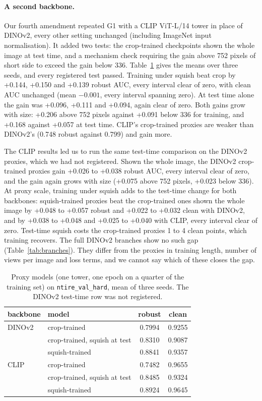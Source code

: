 \documentclass[letterpaper]{article} %
\begin{document}
\paragraph{A second backbone.} Our fourth amendment repeated G1 with a CLIP
ViT-L/14 tower \cite{radford2021clip} in place of DINOv2, every other setting
unchanged (including ImageNet input normalisation). It added two tests: the
crop-trained checkpoints shown the whole image at test time, and a mechanism
check requiring the gain above 752 pixels of short side to exceed the gain
below 336. Table~\ref{tab:clip} gives the means over three seeds, and every
registered test passed. Training under squish beat crop by +0.144, +0.150 and
+0.139 robust AUC, every interval clear of zero, with clean AUC unchanged
(mean $-0.001$, every interval spanning zero). At test time alone the gain
was +0.096, +0.111 and +0.094, again clear of zero. Both gains grow with
size: +0.206 above 752 pixels against +0.091 below 336 for training, and
+0.168 against +0.057 at test time. CLIP's crop-trained proxies are weaker
than DINOv2's (0.748 robust against 0.799) and gain more.

The CLIP results led us to run the same test-time comparison on the DINOv2
proxies, which we had not registered. Shown the whole image, the DINOv2
crop-trained proxies gain +0.026 to +0.038 robust AUC, every interval clear
of zero, and the gain again grows with size (+0.075 above 752 pixels, +0.023
below 336). At proxy scale, training under squish adds to the test-time
change for both backbones: squish-trained proxies beat the crop-trained ones
shown the whole image by +0.048 to +0.057 robust and +0.022 to +0.032 clean
with DINOv2, and by +0.038 to +0.048 and +0.025 to +0.040 with CLIP, every
interval clear of zero. Test-time squish costs the crop-trained proxies 1 to
4 clean points, which training recovers. The full DINOv2 branches show no
such gap (Table~\ref{tab:branches}). They differ from the proxies in training
length, number of views per image and loss terms, and we cannot say which
of these closes the gap.

\begin{table}[t]
\centering
\small
\setlength{\tabcolsep}{4pt}
\begin{tabular}{llcc}
\toprule
backbone & model & robust & clean \\
\midrule
DINOv2 & crop-trained & 0.7994 & 0.9255 \\
       & crop-trained, squish at test & 0.8310 & 0.9087 \\
       & squish-trained & 0.8841 & 0.9357 \\
\midrule
CLIP & crop-trained & 0.7482 & 0.9655 \\
     & crop-trained, squish at test & 0.8485 & 0.9324 \\
     & squish-trained & 0.8924 & 0.9645 \\
\bottomrule
\end{tabular}
\caption{Proxy models (one tower, one epoch on a quarter of the training set)
on \texttt{ntire\_val\_hard}, mean of three seeds. The DINOv2 test-time row
was not registered.}
\label{tab:clip}
\end{table}
\end{document}

